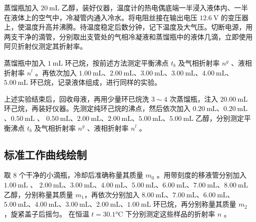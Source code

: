 蒸馏瓶加入 $20 \mathrm{~mL}$ 乙醇，装好仪器，温度计的热电偶底端一半浸入液体内、一半在液体上的空气中，冷凝管内通入冷水。将电阻丝接在输出电压 $12.6 \mathrm{~V}$ 的变压器上，使温度升高并沸腾。待温度稳定后数分钟，记下温度及大气压。切断电源，用两支干净的滴管，分别取出支管处的气相冷凝液和蒸馏瓶中的液体几滴，立即使用阿贝折射仪测定其折射率。

蒸馏瓶中加入 $1 \mathrm{~mL}$ 环己烷，按前述方法测定平衡沸点 $t_b$ 及气相折射率 $n^g$ 、液相折射率 $n^l$ 。再依次加入 $1.00 \mathrm{~mL} $、$ 2.00 \mathrm{~mL} $、$ 3.00 \mathrm{~mL} $、$ 3.00 \mathrm{~mL} $、$ 4.00 \mathrm{~mL} $、$ 5.00 \mathrm{~mL}$ 环已烷，记录液体组成，进行同样的实验。

上述实验结束后，回收母液，再用少量环已烷洗 $3 \sim 4$ 次蒸馏瓶，注入 $20.00 \mathrm{~mL}$ 环己烷，再装好仪器。先测定纯环己烷的沸点，然后依次加入 $0.20 \mathrm{~mL} $、$ 0.20 \mathrm{~mL} $、$ 0.50 \mathrm{~mL}$ $、$ $0.50 \mathrm{~mL} $、$ 2.00 \mathrm{~mL} $、$ 2.00 \mathrm{~mL} $、$ 5.00 \mathrm{~mL} $、$ 5.00 \mathrm{~mL}$ 乙醇，分别测定平衡沸点 $t_b$ 及气相折射率 $n^g$ 、液相折射率 $n^l$ 。

\subsection{标准工作曲线绘制}


取 8 个干净的小滴瓶，冷却后准确称量其质量 $m_0$ 。用带刻度的移液管分别加入 $1.00 \mathrm{~mL}$ $、$ $2.00 \mathrm{~mL} $、$ 3.00 \mathrm{~mL} $、$ 4.00 \mathrm{~mL} $、$ 5.00 \mathrm{~mL} $、$ 6.00 \mathrm{~mL}$、$ 7.00 \mathrm{~mL}$、$ 8.00 \mathrm{~mL}$ 乙醇，分别称量其质量 $m_1$，再依次分别加入 $ 8.00 \mathrm{~mL}$、$ 7.00 \mathrm{~mL}$、$6.00 \mathrm{~mL} $、$ 5.00 \mathrm{~mL} $、$ 4.00 \mathrm{~mL} $、$ 3.00 \mathrm{~mL} $、$ 2.00 \mathrm{~mL} $、$ 1.00 \mathrm{~mL}$ 环已烷，再分别称量其质量 $m_2$，旋紧盖子后摇匀。
在恒温 $t=30.1\si{\celsius}$ 下分别测定这些样品的折射率 $n$ 。

